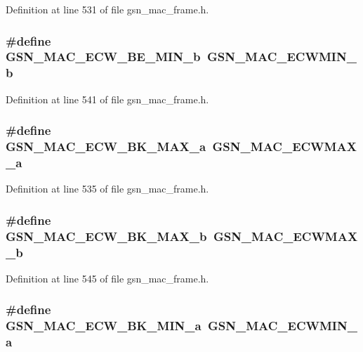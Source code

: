 Definition at line 531 of file gsn\_\-mac\_\-frame.h.

\hypertarget{a00523_ab0ff3f080aa2e256540170abf159e076}{
\subsubsection[{GSN\_\-MAC\_\-ECW\_\-BE\_\-MIN\_\-b}]{\setlength{\rightskip}{0pt plus 5cm}\#define GSN\_\-MAC\_\-ECW\_\-BE\_\-MIN\_\-b~GSN\_\-MAC\_\-ECWMIN\_\-b}}
\label{a00523_ab0ff3f080aa2e256540170abf159e076}


Definition at line 541 of file gsn\_\-mac\_\-frame.h.

\hypertarget{a00523_a67fe1d9c2afff7c9c2690b3248950061}{
\subsubsection[{GSN\_\-MAC\_\-ECW\_\-BK\_\-MAX\_\-a}]{\setlength{\rightskip}{0pt plus 5cm}\#define GSN\_\-MAC\_\-ECW\_\-BK\_\-MAX\_\-a~GSN\_\-MAC\_\-ECWMAX\_\-a}}
\label{a00523_a67fe1d9c2afff7c9c2690b3248950061}


Definition at line 535 of file gsn\_\-mac\_\-frame.h.

\hypertarget{a00523_a016847511b529ce8d925db6a6f017346}{
\subsubsection[{GSN\_\-MAC\_\-ECW\_\-BK\_\-MAX\_\-b}]{\setlength{\rightskip}{0pt plus 5cm}\#define GSN\_\-MAC\_\-ECW\_\-BK\_\-MAX\_\-b~GSN\_\-MAC\_\-ECWMAX\_\-b}}
\label{a00523_a016847511b529ce8d925db6a6f017346}


Definition at line 545 of file gsn\_\-mac\_\-frame.h.

\hypertarget{a00523_a256723c789a2a4cda860226654a93793}{
\subsubsection[{GSN\_\-MAC\_\-ECW\_\-BK\_\-MIN\_\-a}]{\setlength{\rightskip}{0pt plus 5cm}\#define GSN\_\-MAC\_\-ECW\_\-BK\_\-MIN\_\-a~GSN\_\-MAC\_\-ECWMIN\_\-a}}
\label{a00523_a256723c789a2a4cda860226654a93793}


